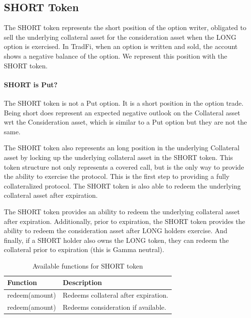 \subsection{SHORT Token}

The SHORT token represents the short position of the option writer,
obligated to sell the underlying collateral asset for the consideration
asset when the LONG option is exercised. 
In TradFi, when an option is written and sold, the account shows a negative balance of the option. 
We represent this position with the SHORT token. 

\paragraph*{SHORT is Put?} The SHORT token is not a Put option. It is a short position in the option trade. 
Being short does represent an expected negative outlook on the Collateral asset wrt the Consideration asset, 
which is similar to a Put option but they are not the same.



The SHORT token also represents an long position in the underlying Collateral asset by locking up the underlying collateral asset in the SHORT token.
This token structure not only represents a covered call, but is the only way to provide the ability to exercise the protocol.
This is the first step to providing a fully collateralized protocol.
The SHORT token is also able to redeem the underlying collateral asset after expiration.

The SHORT token provides an ability to redeem the underlying collateral asset after expiration.
Additionally, prior to expiration, the SHORT token provides the ability to redeem the consideration asset after LONG holders exercise.
And finally, if a SHORT holder also owns the LONG token, they can redeem the collateral prior to expiration (this is Gamma neutral).

\begin{table}[h]
\centering
\begin{tabular}{|p{3cm}|p{4cm}|}
\hline
\textbf{Function} & \textbf{Description} \\
\hline
redeem(amount) & Redeems collateral after expiration. \\
\hline
redeem(amount) & Redeems consideration if available. \\
\hline
\end{tabular}
\caption{Available functions for SHORT token}
\label{tab:functions}
\end{table}


